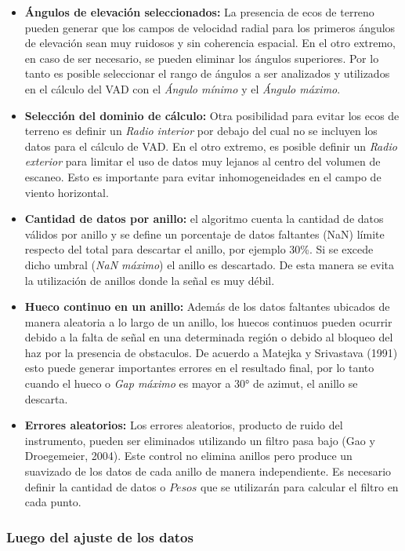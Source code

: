 \documentclass[12pt,spanish,oneside, a4paper]{book}
\providecommand{\tightlist}{%
  \setlength{\itemsep}{0pt}\setlength{\parskip}{0pt}}
\begin{document}
\begin{itemize}
\tightlist
\item
  \textbf{Ángulos de elevación seleccionados:} La presencia de ecos de
  terreno pueden generar que los campos de velocidad radial para los
  primeros ángulos de elevación sean muy ruidosos y sin coherencia
  espacial. En el otro extremo, en caso de ser necesario, se pueden
  eliminar los ángulos superiores. Por lo tanto es posible seleccionar
  el rango de ángulos a ser analizados y utilizados en el cálculo del
  VAD con el \emph{Ángulo mínimo} y el \emph{Ángulo máximo}.
\item
  \textbf{Selección del dominio de cálculo:} Otra posibilidad para
  evitar los ecos de terreno es definir un \emph{Radio interior} por
  debajo del cual no se incluyen los datos para el cálculo de VAD. En el
  otro extremo, es posible definir un \emph{Radio exterior} para limitar
  el uso de datos muy lejanos al centro del volumen de escaneo. Esto es
  importante para evitar inhomogeneidades en el campo de viento
  horizontal.
\item
  \textbf{Cantidad de datos por anillo:} el algoritmo cuenta la cantidad
  de datos válidos por anillo y se define un porcentaje de datos
  faltantes (NaN) límite respecto del total para descartar el anillo,
  por ejemplo 30\%. Si se excede dicho umbral (\emph{NaN máximo}) el
  anillo es descartado. De esta manera se evita la utilización de
  anillos donde la señal es muy débil.
\item
  \textbf{Hueco continuo en un anillo:} Además de los datos faltantes
  ubicados de manera aleatoria a lo largo de un anillo, los huecos
  continuos pueden ocurrir debido a la falta de señal en una determinada
  región o debido al bloqueo del haz por la presencia de obstaculos. De
  acuerdo a Matejka y Srivastava (1991) esto puede generar importantes
  errores en el resultado final, por lo tanto cuando el hueco o
  \emph{Gap máximo} es mayor a 30° de azimut, el anillo se descarta.
\item
  \textbf{Errores aleatorios:} Los errores aleatorios, producto de ruido
  del instrumento, pueden ser eliminados utilizando un filtro pasa bajo
  (Gao y Droegemeier, 2004). Este control no elimina anillos pero
  produce un suavizado de los datos de cada anillo de manera
  independiente. Es necesario definir la cantidad de datos o \(Pesos\)
  que se utilizarán para calcular el filtro en cada punto.
\end{itemize}

\subsubsection{Luego del ajuste de los
datos}\label{luego-del-ajuste-de-los-datos}
\end{document}
